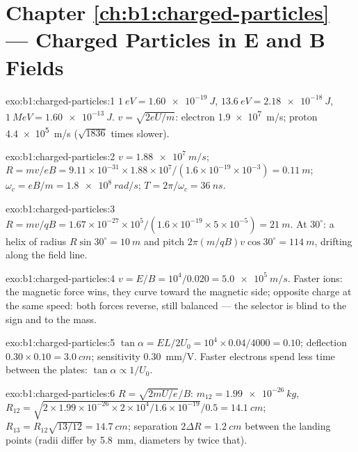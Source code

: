 \section*{Chapter \ref{ch:b1:charged-particles} --- Charged Particles in E and B Fields}

\begin{solution}{exo:b1:charged-particles:1}
$\qty{1}{eV} = \qty{1.60e-19}{J}$, $\qty{13.6}{eV} = \qty{2.18e-18}{J}$,
$\qty{1}{MeV} = \qty{1.60e-13}{J}$. $v = \sqrt{2eU/m}$: electron
\qty{1.9e7}{m/s}; proton \qty{4.4e5}{m/s} ($\sqrt{1836}$ times slower).
\end{solution}

\begin{solution}{exo:b1:charged-particles:2}
$v = \qty{1.88e7}{m/s}$; $R = mv/eB = 9.11\times10^{-31} \times 1.88\times10^7/
(1.6\times10^{-19} \times 10^{-3}) = \qty{0.11}{m}$; $\omega_c = eB/m =
\qty{1.8e8}{rad/s}$; $T = 2\pi/\omega_c = \qty{36}{ns}$.
\end{solution}

\begin{solution}{exo:b1:charged-particles:3}
$R = mv/qB = 1.67\times10^{-27} \times 10^5/(1.6\times10^{-19} \times 5\times
10^{-5}) = \qty{21}{m}$. At $30^\circ$: a helix of radius $R\sin 30^\circ
= \qty{10}{m}$ and pitch $2\pi(m/qB)v\cos 30^\circ = \qty{114}{m}$, drifting
along the field line.
\end{solution}

\begin{solution}{exo:b1:charged-particles:4}
$v = E/B = 10^4/0.020 = \qty{5.0e5}{m/s}$. Faster ions: the magnetic force
wins, they curve toward the magnetic side; opposite charge at the same
speed: both forces reverse, still balanced --- the selector is blind to
the sign and to the mass.
\end{solution}

\begin{solution}{exo:b1:charged-particles:5}
$\tan\alpha = EL/2U_0 = 10^4 \times 0.04/4000 = 0.10$; deflection
$0.30 \times 0.10 = \qty{3.0}{cm}$; sensitivity \qty{0.30}{mm/V}. Faster
electrons spend less time between the plates: $\tan\alpha \propto 1/U_0$.
\end{solution}

\begin{solution}{exo:b1:charged-particles:6}
$R = \sqrt{2mU/e}/B$: $m_{12} = \qty{1.99e-26}{kg}$, $R_{12} = \sqrt{2 \times
1.99\times10^{-26} \times 2\times10^4/1.6\times10^{-19}}/0.5 = \qty{14.1}{cm}$;
$R_{13} = R_{12}\sqrt{13/12} = \qty{14.7}{cm}$; separation $2\Delta R =
\qty{1.2}{cm}$ between the landing points (radii differ by \qty{5.8}{mm},
diameters by twice that).
\end{solution}

